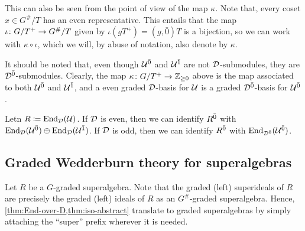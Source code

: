 This can also be seen from the point of view of the map $\kappa$. 
Note that, every coset $x \in G^\#/T$ has an even representative. 
This entails that the map $\iota\colon G/T^+ \to G^\#/T$ given by $\iota ( gT^+) = (g, \bar 0) T$ is a bijection, so we can work with $\kappa \circ \iota$, which we will, by abuse of notation, also denote by $\kappa$. 

It should be noted that, even though $\mathcal U^{\bar0}$ and $\mathcal U^{\bar1}$ are not $\mathcal{D}$-submodules, they are $\mathcal{D}^{\bar0}$-submodules. 
Clearly, the map $\kappa\colon G/T^+ \to \mathbb{Z}_{\geq 0}$ above is the map associated to both $\mathcal U^{\bar0}$ and $\mathcal U^{\bar1}$, and a even graded $\mathcal{D}$-basis for $\mathcal U$ is a graded $\mathcal{D}^{\bar0}$-basis for $\mathcal U^{\bar0}$. 

\begin{remark}\label{rmk:R-even-identificatios}
    Letn $R \coloneqq \operatorname{End}_{\mathcal{D}}(\mathcal U)$. 
    If $\mathcal{D}$ is even, then we can identify $R^{\bar0}$ with $\operatorname{End}_{\mathcal{D}}(\mathcal U^{\bar0}) \oplus \operatorname{End}_{\mathcal{D}} (\mathcal U^{\bar1})$. 
    If $\mathcal{D}$ is odd, then we can identify $R^{\bar0}$ with $\operatorname{End}_{\mathcal{D}^{\bar0}}(\mathcal U^{\bar0})$. 
\end{remark}

\subsection{Graded Wedderburn theory for superalgebras}\label{ssec:wedderburn-super}

Let $R$ be a $G$-graded superalgebra. 
Note that the graded (left) superideals of $R$ are precisely the graded (left) ideals of $R$ as an $G^\#$-graded superalgebra. 
Hence, \cref{thm:End-over-D,thm:iso-abstract} translate to graded superalgebras by simply attaching the ``super'' prefix wherever it is needed. 


